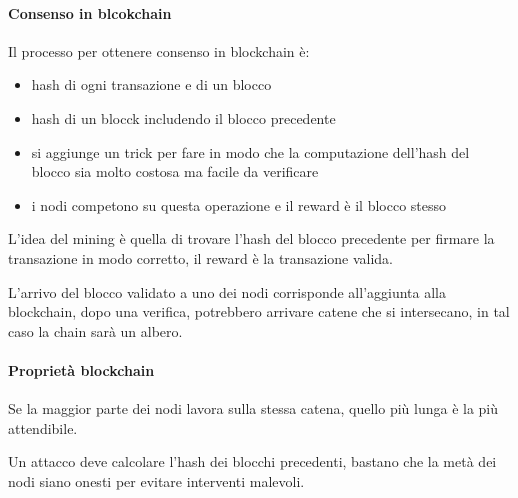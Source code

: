 \paragraph{Consenso in blcokchain}
Il processo per ottenere consenso in blockchain è:
\begin{itemize}
    \item hash di ogni transazione e di un blocco
    \item hash di un blocck includendo il blocco precedente
    \item si aggiunge un trick per fare in modo che la computazione 
    dell'hash del blocco sia molto costosa ma facile da verificare
    \item i nodi competono su questa operazione e il reward è 
    il blocco stesso 
\end{itemize} 
L'idea del mining è quella di trovare l'hash del blocco precedente 
per firmare la transazione in modo corretto, il reward è la transazione valida.

L'arrivo del blocco validato a uno dei nodi corrisponde all'aggiunta 
alla blockchain, dopo una verifica, potrebbero arrivare catene che si intersecano, 
in tal caso la chain sarà un albero.

\paragraph{Proprietà blockchain}
Se la maggior parte dei nodi lavora sulla stessa catena, quello più lunga è la più
attendibile. 

Un attacco deve calcolare l'hash dei blocchi precedenti, bastano che la metà
dei nodi siano onesti per evitare interventi malevoli.

